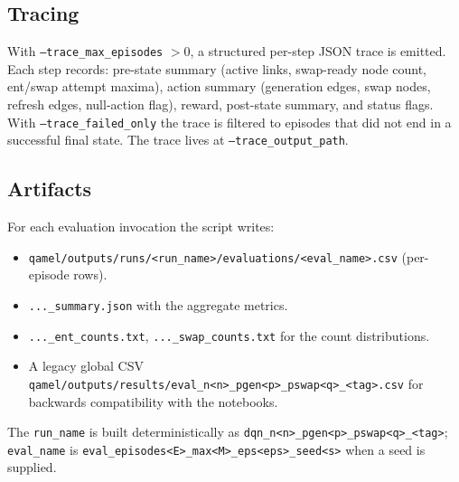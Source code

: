 \documentclass[11pt]{article}
\newcommand{\code}[1]{\texttt{#1}}
\newcommand{\file}[1]{\texttt{\small #1}}
\begin{document}
\subsection{Tracing}
With \code{--trace\_max\_episodes} $>0$, a structured per-step JSON trace is emitted. Each step records: pre-state summary (active links, swap-ready node count, ent/swap attempt maxima), action summary (generation edges, swap nodes, refresh edges, null-action flag), reward, post-state summary, and status flags. With \code{--trace\_failed\_only} the trace is filtered to episodes that did not end in a successful final state. The trace lives at \code{--trace\_output\_path}.

\subsection{Artifacts}
For each evaluation invocation the script writes:
\begin{itemize}
  \item \file{qamel/outputs/runs/\textless run\_name\textgreater/evaluations/\textless eval\_name\textgreater.csv} (per-episode rows).
  \item \file{...\_summary.json} with the aggregate metrics.
  \item \file{...\_ent\_counts.txt}, \file{...\_swap\_counts.txt} for the count distributions.
  \item A legacy global CSV \file{qamel/outputs/results/eval\_n\textless n\textgreater\_pgen\textless p\textgreater\_pswap\textless q\textgreater\_\textless tag\textgreater.csv} for backwards compatibility with the notebooks.
\end{itemize}
The \code{run\_name} is built deterministically as \code{dqn\_n\textless n\textgreater\_pgen\textless p\textgreater\_pswap\textless q\textgreater\_\textless tag\textgreater}; \code{eval\_name} is \code{eval\_episodes\textless E\textgreater\_max\textless M\textgreater\_eps\textless eps\textgreater\_seed\textless s\textgreater} when a seed is supplied.
\end{document}
